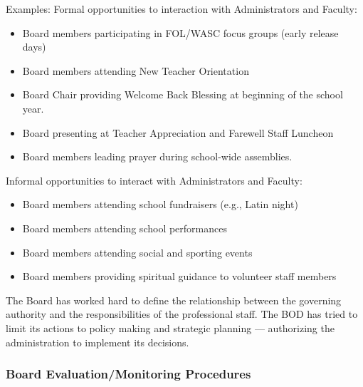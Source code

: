 \begin{findings}
Examples:
Formal opportunities to interaction with Administrators and Faculty:
\begin{itemize}
\item Board members participating in FOL/WASC focus groups (early release days)
\item Board members attending New Teacher Orientation
\item Board Chair providing Welcome Back Blessing at beginning of the school year. 
\item Board presenting at Teacher Appreciation and Farewell Staff Luncheon 
\item Board members leading prayer during school-wide assemblies.
\end{itemize}

Informal opportunities to interact with Administrators and Faculty: 
\begin{itemize}
\item Board members attending school fundraisers (e.g., Latin night)
\item Board members attending school performances
\item Board members attending social and sporting events
\item Board members providing spiritual guidance to volunteer staff members
\end{itemize}


The Board has worked hard to define the relationship between the governing authority and the responsibilities of the professional staff. The BOD has tried to limit its actions to policy making and strategic planning — authorizing the administration to implement its decisions.
\end{findings}

\subsubsection{Board Evaluation/Monitoring Procedures}



